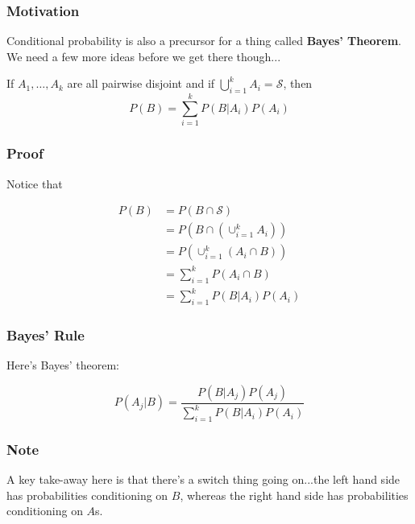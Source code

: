\documentclass{beamer}
\begin{document}


\begin{frame}
\frametitle{Motivation}

Conditional probability is also a precursor for a thing called \textbf{Bayes' Theorem}. We need a few more ideas before we get there though...
\newline

If $A_1, \ldots, A_k$ are all pairwise disjoint and if $\bigcup_{i=1}^k A_i = \mathcal{S}$, then 
\[
P(B) = \sum_{i=1}^k P(B|A_i)P(A_i)
\]




\end{frame}




\begin{frame}
\frametitle{Proof}

Notice that

\begin{align*}
P(B) &= P(B \cap \mathcal{S}) \\
&= P(B \cap (\cup_{i=1}^k A_i)) \\
&= P\left(\cup_{i=1}^k (A_i \cap B) \right) \\
&= \sum_{i=1}^k P\left( A_i \cap B \right) \\
&= \sum_{i=1}^k P\left( B | A_i \right) P(A_i)
\end{align*}

\end{frame}



\begin{frame}
\frametitle{Bayes' Rule}

Here's Bayes' theorem:

\[
P(A_j | B) = \frac{P(B | A_j) P(A_j) }{\sum_{i=1}^kP(B | A_i) P(A_i)}
\]

\end{frame}


\begin{frame}
\frametitle{Note}

A key take-away here is that there's a switch thing going on...the left hand side has probabilities conditioning on $B$, whereas the right hand side has probabilities conditioning on $A$s.

\end{frame}
\end{document}

